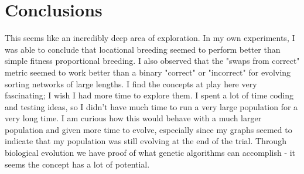 \documentclass[9pt]{article}
\begin{document}
 
\section{Conclusions}

This seems like an incredibly deep area of exploration. In my own experiments, I was able to conclude that locational breeding seemed to perform better than simple fitness proportional breeding. I also observed that the "swaps from correct" metric seemed to work better than a binary "correct" or "incorrect" for evolving sorting networks of large lengths. I find the concepts at play here very fascinating; I wish I had more time to explore them. I spent a lot of time coding and testing ideas, so I didn't have much time to run a very large population for a very long time. I am curious how this would behave with a much larger population and given more time to evolve, especially since my graphs seemed to indicate that my population was still evolving at the end of the trial. Through biological evolution we have proof of what genetic algorithms can accomplish - it seems the concept has a lot of potential. 
\end{document}
